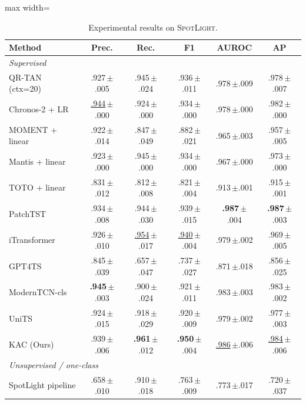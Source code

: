 \documentclass[conference]{IEEEtran}
\newcommand{\sd}[1]{\,{\fontsize{6pt}{7pt}\selectfont $\pm$#1}}
\begin{document}
\begin{table}[t]
  \centering
  \caption{Experimental results on \textsc{SpotLight}.}
  \label{tab:spotlight_benchmark}
  \footnotesize
  \setlength{\tabcolsep}{2pt}
  \begin{adjustbox}{max width=\columnwidth}
  \begin{tabular}{@{}lccccc@{}}
    \toprule
    \textbf{Method} & \textbf{Prec.} & \textbf{Rec.} & \textbf{F1} & \textbf{AUROC} & \textbf{AP} \\
    \midrule
    \multicolumn{6}{l}{\emph{Supervised}} \\
    QR-TAN (ctx=20)                      & .927\sd{.005} & .945\sd{.024} & .936\sd{.011} & .978\sd{.009} & .978\sd{.007} \\
    Chronos-2 + LR                       & \underline{.944}\sd{.000} & .924\sd{.000} & .934\sd{.000} & .978\sd{.000} & .982\sd{.000} \\
    MOMENT + linear      & .922\sd{.014} & .847\sd{.049} & .882\sd{.021} & .965\sd{.003} & .957\sd{.005} \\
    Mantis + linear     & .923\sd{.000} & .945\sd{.000} & .934\sd{.000} & .967\sd{.000} & .973\sd{.000} \\
    TOTO + linear            & .831\sd{.012} & .812\sd{.008} & .821\sd{.004} & .913\sd{.001} & .915\sd{.001} \\
    PatchTST      & .934\sd{.008} & .944\sd{.030} & .939\sd{.015} & \textbf{.987}\sd{.004} & \textbf{.987}\sd{.003} \\
    iTransformer & .926\sd{.010} & \underline{.954}\sd{.017} & \underline{.940}\sd{.004} & .979\sd{.002} & .969\sd{.005} \\
    GPT4TS         & .845\sd{.039} & .657\sd{.047} & .737\sd{.027} & .871\sd{.018} & .856\sd{.025} \\
    ModernTCN-cls & \textbf{.945}\sd{.003} & .900\sd{.024} & .921\sd{.011} & .983\sd{.003} & .983\sd{.002} \\
    UniTS            & .924\sd{.015} & .918\sd{.029} & .920\sd{.009} & .979\sd{.002} & .977\sd{.003} \\
    KAC (Ours)                           & .939\sd{.006} & \textbf{.961}\sd{.012} & \textbf{.950}\sd{.004} & \underline{.986}\sd{.006} & \underline{.984}\sd{.006} \\
    \midrule
    \multicolumn{6}{l}{\emph{Unsupervised / one-class}} \\
    SpotLight pipeline & .658\sd{.010} & .910\sd{.018} & .763\sd{.009} & .773\sd{.017} & .720\sd{.037} \\

\end{tabular}
\end{adjustbox}
\end{table}
\end{document}

